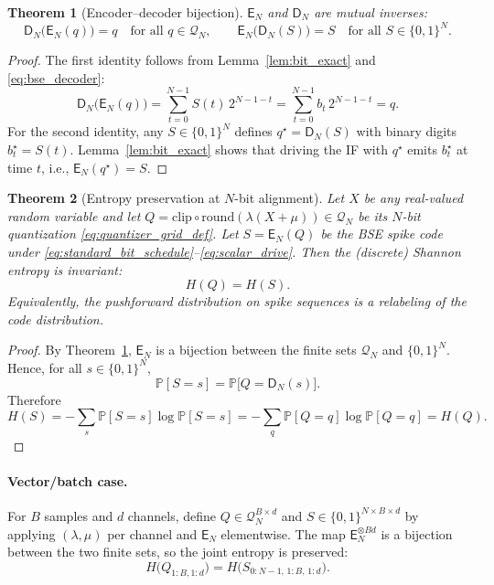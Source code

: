 \documentclass{article}
\theoremstyle{plain}
\newtheorem{theorem}{Theorem}[section]
\theoremstyle{definition}
\theoremstyle{remark}
\begin{document}
\begin{theorem}[Encoder–decoder bijection]
\label{thm:bijective}
$\mathsf{E}_N$ and $\mathsf{D}_N$ are mutual inverses:
\[
\mathsf{D}_N\big(\mathsf{E}_N(q)\big)=q\quad\text{for all }q\in\mathcal{Q}_N,
\qquad
\mathsf{E}_N\big(\mathsf{D}_N(S)\big)=S\quad\text{for all }S\in\{0,1\}^{N}.
\]
\end{theorem}

\begin{proof}
The first identity follows from Lemma~\ref{lem:bit_exact} and \eqref{eq:bse_decoder}:
\[
\mathsf{D}_N\big(\mathsf{E}_N(q)\big)=\sum_{t=0}^{N-1} S(t)\,2^{N-1-t}=\sum_{t=0}^{N-1} b_t\,2^{N-1-t}=q.
\]
For the second identity, any $S\in\{0,1\}^N$ defines $q^\star=\mathsf{D}_N(S)$ with binary digits $b_t^\star=S(t)$. Lemma~\ref{lem:bit_exact} shows that driving the IF with $q^\star$ emits $b_t^\star$ at time $t$, i.e., $\mathsf{E}_N(q^\star)=S$.
\end{proof}

\begin{theorem}[Entropy preservation at $N$-bit alignment]
\label{thm:entropy_preservation}
Let $X$ be any real-valued random variable and let $Q=\mathrm{clip}\!\circ\!\mathrm{round}(\lambda(X+\mu))\in\mathcal{Q}_N$ be its $N$-bit quantization \eqref{eq:quantizer_grid_def}. Let $S=\mathsf{E}_N(Q)$ be the BSE spike code under \eqref{eq:standard_bit_schedule}–\eqref{eq:scalar_drive}. Then the (discrete) Shannon entropy is invariant:
\[
H(Q)=H(S).
\]
Equivalently, the pushforward distribution on spike sequences is a relabeling of the code distribution.
\end{theorem}

\begin{proof}
By Theorem~\ref{thm:bijective}, $\mathsf{E}_N$ is a bijection between the finite sets $\mathcal{Q}_N$ and $\{0,1\}^{N}$. Hence, for all $s\in\{0,1\}^{N}$,
\[
\mathbb{P}[S=s]=\mathbb{P}\big[Q=\mathsf{D}_N(s)\big].
\]
Therefore
\[
H(S)=-\sum_{s}\mathbb{P}[S=s]\log \mathbb{P}[S=s]
=-\sum_{q}\mathbb{P}[Q=q]\log \mathbb{P}[Q=q]=H(Q).
\]
\end{proof}

\paragraph{Vector/batch case.}
For $B$ samples and $d$ channels, define $Q\in\mathcal{Q}_N^{B\times d}$ and $S\in\{0,1\}^{N\times B\times d}$ by applying $(\lambda,\mu)$ per channel and $\mathsf{E}_N$ elementwise. The map $\mathsf{E}_N^{\otimes Bd}$ is a bijection between the two finite sets, so the joint entropy is preserved:
\[
H\big(Q_{1:B,1:d}\big)=H\big(S_{0:N-1,\,1:B,\,1:d}\big).
\]
\end{document}
